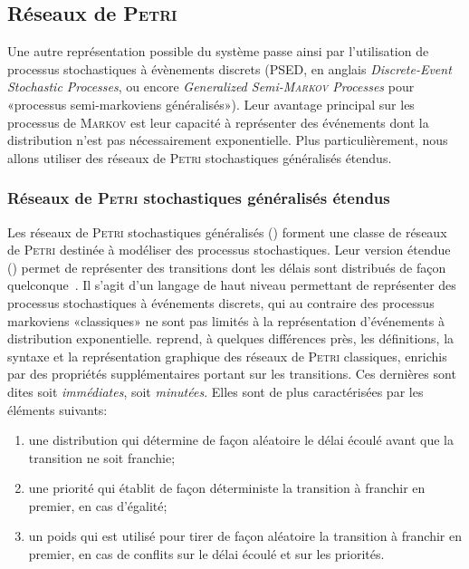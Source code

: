     \subsection{Réseaux de \textsc{Petri}}

Une autre représentation possible du système passe ainsi par l'utilisation de processus stochastiques à évènements discrets (PSED, en anglais \textit{Discrete-Event Stochastic Processes}, ou encore \textit{Generalized Semi-\textsc{Markov} Processes} pour «processus semi-markoviens généralisés»).
Leur avantage principal sur les processus de \textsc{Markov} est leur capacité à représenter des événements dont la distribution n'est pas nécessairement exponentielle.
Plus particulièrement, nous allons utiliser des réseaux de \textsc{Petri} stochastiques généralisés étendus.

        \subsubsection{Réseaux de \textsc{Petri} stochastiques généralisés étendus}
\label{sa:subsubsec:presRPSGe}
Les réseaux de \textsc{Petri} stochastiques généralisés (\rpsg) forment une classe de réseaux de \textsc{Petri} destinée à modéliser des processus stochastiques.
Leur version étendue (\rpsge) permet de représenter des transitions dont les délais sont distribués de façon quelconque~\cite{ABCDF95}.
Il s'agit d'un langage de haut niveau permettant de représenter des processus stochastiques à événements discrets, qui au contraire des processus markoviens «classiques» ne sont pas limités à la représentation d'événements à distribution exponentielle.
\rpsge reprend, à quelques différences près, les définitions, la syntaxe et la représentation graphique des réseaux de \textsc{Petri} classiques, enrichis par des propriétés supplémentaires portant sur les transitions.
Ces dernières sont dites soit \textit{immédiates}, soit \textit{minutées}.
Elles sont de plus caractérisées par les éléments suivants:
\begin{enumerate}
    \item une distribution qui détermine de façon aléatoire le délai écoulé avant que la transition ne soit franchie;
    \item une priorité qui établit de façon déterministe la transition à franchir en premier, en cas d'égalité;
    \item un poids qui est utilisé pour tirer de façon aléatoire la transition à franchir en premier, en cas de conflits sur le délai écoulé et sur les priorités.
\end{enumerate}

